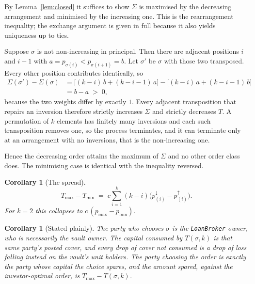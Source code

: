 \documentclass[11pt]{article}
\makeatletter
\theoremstyle{orma}
\newtheorem{corollary}[theorem]{Corollary}
\theoremstyle{ormaupright}
\renewenvironment{proof}[1][\proofname]{%
  \par\addvspace{5pt}%
  \pushQED{\qed}%
  \normalfont
  \list{}{\leftmargin=1.8em \rightmargin=0pt \topsep=0pt
          \parsep=\parskip \itemsep=0pt \labelwidth=0pt \labelsep=0pt}%
  \item[]\relax
  {\itshape #1\@addpunct{.}}\hspace{0.75em}\ignorespaces
}{%
  \popQED\endlist\@endpefalse\addvspace{5pt}%
}
\makeatother
\begin{document}
\begin{proof}
By Lemma~\ref{lem:closed} it suffices to show $\Sigma$ is maximised by the decreasing
arrangement and minimised by the increasing one. This is the rearrangement inequality; the
exchange argument is given in full because it also yields uniqueness up to ties.

Suppose $\sigma$ is not non-increasing in principal. Then there are adjacent positions $i$
and $i+1$ with $a = p_{\sigma(i)} < p_{\sigma(i+1)} = b$. Let $\sigma'$ be $\sigma$ with
those two transposed. Every other position contributes identically, so
\begin{align}
  \Sigma(\sigma') - \Sigma(\sigma)
  &= \big[(k-i)\,b + (k-i-1)\,a\big] - \big[(k-i)\,a + (k-i-1)\,b\big]
  \\[4pt]
  &= b - a \;>\; 0 ,
\end{align}
because the two weights differ by exactly $1$. Every adjacent transposition that repairs an
inversion therefore strictly increases $\Sigma$ and strictly decreases $T$. A permutation of
$k$ elements has finitely many inversions and each such transposition removes one, so the
process terminates, and it can terminate only at an arrangement with no inversions, that is
the non-increasing one.

Hence the decreasing order attains the maximum of $\Sigma$ and no
other order class does. The minimising case is identical with the inequality reversed.
\end{proof}

\begin{corollary}[The spread]
\label{cor:spread}
\begin{equation}
  T_{\max} - T_{\min} \;=\; c \sum_{i=1}^{k} (k-i)
    \big( p_{(i)}^{\downarrow} - p_{(i)}^{\uparrow} \big).
\end{equation}
For $k = 2$ this collapses to $c\,( p_{\max} - p_{\min} )$.
\end{corollary}

\begin{corollary}[Stated plainly]
\label{cor:plain}
The party who chooses $\sigma$ is the \texttt{LoanBroker} owner, who is necessarily the vault
owner. The capital consumed by $T(\sigma, k)$ is that same party's posted cover, and every
drop of cover not consumed is a drop of loss falling instead on the vault's unit holders.
The party choosing the order is exactly the party whose capital the choice spares, and the
amount spared, against the investor-optimal order, is $T_{\max} - T(\sigma, k)$.
\end{corollary}
\end{document}
